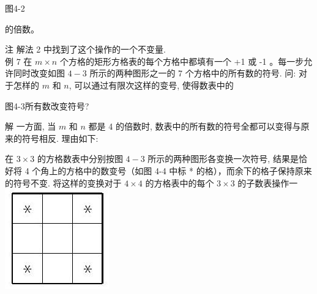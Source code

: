 \documentclass[10pt]{article}
\begin{document}
图4-2

的倍数。

注 解法 2 中找到了这个操作的一个不变量.\\
例 7 在 $m \times n$ 个方格的矩形方格表的每个方格中都填有一个 +1 或 -1 。每一步允许同时改变如图 $4-3$ 所示的两种图形之一的 7 个方格中的所有数的符号. 问: 对于怎样的 $m$ 和 $n$, 可以通过有限次这样的变号, 使得数表中的

图4-3所有数改变符号?

解 一方面, 当 $m$ 和 $n$ 都是 4 的倍数时, 数表中的所有数的符号全都可以变得与原来的符号相反. 理由如下:

在 $3 \times 3$ 的方格数表中分别按图 $4-3$ 所示的两种图形各变换一次符号, 结果是恰好将 4 个角上的方格中的数变号（如图 4-4 中标 * 的格），而余下的格子保持原来的符号不变. 将这样的变换对于 $4 \times 4$ 的方格表中的每个 $3 \times 3$ 的子数表操作一\\
\includegraphics[max width=\textwidth, center]{2024_10_09_bce9f07034ef55fc9c97g-45}
\end{document}
